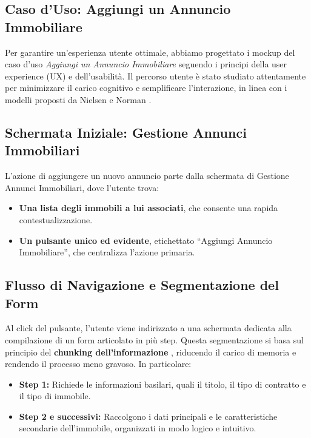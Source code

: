 \subsection{Caso d'Uso: Aggiungi un Annuncio Immobiliare}

Per garantire un’esperienza utente ottimale, abbiamo progettato i mockup del caso d'uso \textit{Aggiungi un Annuncio Immobiliare} seguendo i principi della user experience (UX) e dell'usabilità. Il percorso utente è stato studiato attentamente per minimizzare il carico cognitivo e semplificare l’interazione, in linea con i modelli proposti da Nielsen e Norman \cite{nielsen1995,norman1988}.

\subsection*{Schermata Iniziale: Gestione Annunci Immobiliari}
L’azione di aggiungere un nuovo annuncio parte dalla schermata di Gestione Annunci Immobiliari, dove l’utente trova:
\begin{itemize}
    \item \textbf{Una lista degli immobili a lui associati}, che consente una rapida contestualizzazione.
    \item \textbf{Un pulsante unico ed evidente}, etichettato “Aggiungi Annuncio Immobiliare”, che centralizza l’azione primaria.
\end{itemize}

\subsection*{Flusso di Navigazione e Segmentazione del Form}
Al click del pulsante, l’utente viene indirizzato a una schermata dedicata alla compilazione di un form articolato in più step. Questa segmentazione si basa sul principio del \textbf{chunking dell’informazione} \cite{miller1956}, riducendo il carico di memoria e rendendo il processo meno gravoso. In particolare:
\begin{itemize}
    \item \textbf{Step 1:} Richiede le informazioni basilari, quali il titolo, il tipo di contratto e il tipo di immobile.
    \item \textbf{Step 2 e successivi:} Raccolgono i dati principali e le caratteristiche secondarie dell’immobile, organizzati in modo logico e intuitivo.
\end{itemize}


